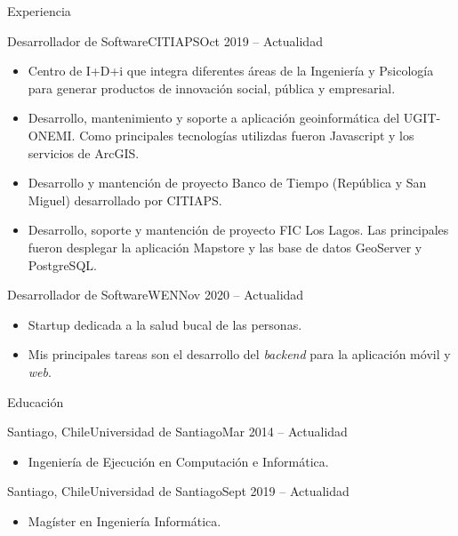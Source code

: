 \documentclass[]{mcdowellcv}
\begin{document}
	\makeheader
	
	\begin{cvsection}{Experiencia}
		\begin{cvsubsection}{Desarrollador de Software}{CITIAPS}{Oct 2019 -- Actualidad}
			\begin{itemize}
				\item Centro de I+D+i que integra diferentes áreas de la Ingeniería y Psicología para generar productos de innovación social, pública y empresarial.
				\item Desarrollo, mantenimiento y soporte a aplicación geoinformática del UGIT-ONEMI. Como principales tecnologías utilizdas fueron Javascript y los servicios de ArcGIS.
				\item Desarrollo y mantención de proyecto Banco de Tiempo (República y San Miguel) desarrollado por CITIAPS.
				\item Desarrollo, soporte y mantención de proyecto FIC Los Lagos. Las principales fueron desplegar la aplicación Mapstore y las base de datos GeoServer y PostgreSQL.  
			\end{itemize}
		\end{cvsubsection}
		
		\begin{cvsubsection}{Desarrollador de Software}{WEN}{Nov 2020 -- Actualidad}		
			\begin{itemize}
				\item Startup dedicada a la salud bucal de las personas.
				\item Mis principales tareas son el desarrollo del \textit{backend} para la aplicación móvil y \textit{web}.
			\end{itemize}
		\end{cvsubsection}
	\end{cvsection}
	
	\begin{cvsection}{Educación}
		\begin{cvsubsection}{Santiago, Chile}{Universidad de Santiago}{Mar 2014 -- Actualidad}
			\begin{itemize}
				\item Ingeniería de Ejecución en Computación e Informática.
			\end{itemize}
		\end{cvsubsection}
		\begin{cvsubsection}{Santiago, Chile}{Universidad de Santiago}{Sept 2019 -- Actualidad}
			\begin{itemize}
				\item Magíster en Ingeniería Informática.
			\end{itemize}
		\end{cvsubsection}
	\end{cvsection}
	
\end{document}
